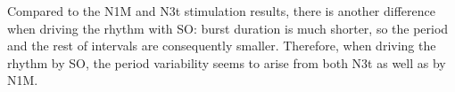 
Compared to the N1M and N3t stimulation results, there is another difference when driving the rhythm with SO: burst duration is much shorter, so the period and the rest of intervals are consequently smaller. Therefore, when driving the rhythm by SO, the period variability seems to arise from both N3t as well as by N1M. 

